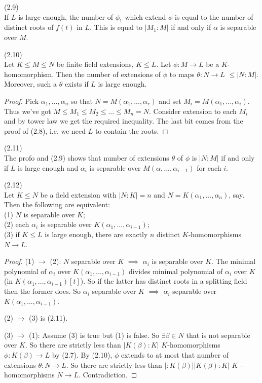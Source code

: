 \documentclass[a4paper]{article}
\begin{document}
\begin{coro}(2.9)\\
If $L$ is large enough, the number of $\phi_1$ which extend $\phi$ is equal to the number of distinct roots of $f(t)$ in $L$. This is equal to $|M_1:M|$ if and only if $\alpha$ is separable over $M$.
\end{coro}

\begin{coro}(2.10)\\
Let $K \leq M \leq N$ be finite field extensions, $K \leq L$. Let $\phi:M \to L$ be a $K$-homomorphism. Then the number of extensions of $\phi$ to maps $\theta:N \to L$ $\leq |N:M|$. Moreover, such a $\theta$ exists if $L$ is large enough.
\begin{proof}
Pick $\alpha_1,...,\alpha_n$ so that $N=M(\alpha_1,...,\alpha_r)$ and set $M_i = M(\alpha_1,...,\alpha_i)$. Thus we've got $M \leq M_1 \leq M_2 \leq ... \leq M_n = N$. Consider extension to each $M_i$ and by tower law we get the required inequality. The last bit comes from the proof of (2.8), i.e. we need $L$ to contain the roots.
\end{proof}
\end{coro}

\begin{rem}(2.11)\\
The profo and (2.9) shows that number of extensions $\theta$ of $\phi$ is $|N:M|$ if and only if $L$ is large enough and $\alpha_i$ is separable over $M(\alpha,...,\alpha_{i-1})$ for each $i$.
\end{rem}

\begin{thm}(2.12)\\
Let $K \leq N$ be a field extension with $|N:K| = n$ and $N=K(\alpha_1,...,\alpha_n)$, say. Then the following are equivalent:\\
(1) $N$ is separable over $K$;\\
(2) each $\alpha_i$ is separable over $K(\alpha_1,...,\alpha_{i-1})$;\\
(3) if $K\leq L$ is large enough, there are exactly $n$ distinct $K$-homomorphisms $N \to L$.
\begin{proof}
(1) $\to$ (2): $N$ separable over $K$ $\implies$ $\alpha_i$ is separable over $K$. The minimal polynomial of $\alpha_i$ over $K(\alpha_1,...,\alpha_{i-1})$ divides minimal polynomial of $\alpha_i$ over $K$ (in $K(\alpha_1,...,\alpha_{i-1})[t]$). So if the latter has distinct roots in a splitting field then the former does. So $\alpha_i$ separable over $K$ $\implies$ $\alpha_i$ separable over $K(\alpha_1,...,\alpha_{i-1})$.

(2) $\to$ (3) is (2.11).

(3) $\to$ (1): Assume (3) is true but (1) is false. So $\exists \beta \in N$ that is not separable over $K$. So there are strictly less than $|K(\beta):K|$ $K$-homomorphisms $\phi:K(\beta) \to L$ by (2.7). By (2.10), $\phi$ extends to at most that number of extensions $\theta:N \to L$. So there are strictly less than $|:K(\beta)||K(\beta):K|$ $K-$homomorphisms $N \to L$. Contradiction.
\end{proof}
\end{thm}
\end{document}
